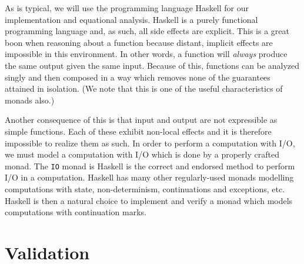 \documentclass[ms]{byuprop}
\begin{document}




As is typical, we will use the programming language Haskell \cite{hudak1992report} for our
implementation and equational analysis. Haskell is a purely functional programming
language and, as such, all side effects are explicit. This is a great boon when reasoning
about a function because distant, implicit effects are impossible in this environment. In
other words, a function will \emph{always} produce the same output given the same input.
Because of this, functions can be analyzed singly and then composed in a way which removes
none of the guarantees attained in isolation. (We note that this is one of the useful
characteristics of monads also.)


Another consequence of this is that input and output are not expressible as simple
functions. Each of these exhibit non-local effects and it is therefore impossible to
realize them as such. In order to perform a computation with I/O, we must model a
computation with I/O which is done by a properly crafted monad. The \texttt{IO} monad is
Haskell is the correct and endorsed method to perform I/O in a computation. Haskell has
many other regularly-used monads modelling computations with state, non-determinism,
continuations and exceptions, etc. Haskell is then a natural choice to implement and
verify a monad which models computations with continuation marks.

\section{Validation}

\end{document}
